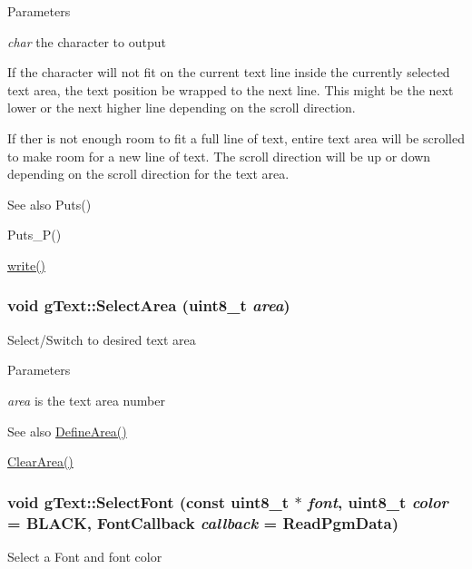 \begin{DoxyParams}{Parameters}
\item[{\em char}]the character to output\end{DoxyParams}
If the character will not fit on the current text line inside the currently selected text area, the text position be wrapped to the next line. This might be the next lower or the next higher line depending on the scroll direction.

If ther is not enough room to fit a full line of text, entire text area will be scrolled to make room for a new line of text. The scroll direction will be up or down depending on the scroll direction for the text area.

\begin{DoxySeeAlso}{See also}
Puts() 

Puts\_\-P() 

\hyperlink{classg_text_a7f537bfce982c46779f61321df66b018}{write()} 
\end{DoxySeeAlso}
\hypertarget{classg_text_a3d2fcd1f48b1e44611b7cf6fb2bae5db}{
\subsubsection[{SelectArea}]{\setlength{\rightskip}{0pt plus 5cm}void gText::SelectArea (uint8\_\-t {\em area})}}
\label{classg_text_a3d2fcd1f48b1e44611b7cf6fb2bae5db}
Select/Switch to desired text area


\begin{DoxyParams}{Parameters}
\item[{\em area}]is the text area number \end{DoxyParams}
\begin{DoxySeeAlso}{See also}
\hyperlink{classg_text_a8bc94b15c7864ef34491e8ef5681bfd4}{DefineArea()} 

\hyperlink{classg_text_a8918c2e7b5b1121a6c9051db049c85bf}{ClearArea()} 
\end{DoxySeeAlso}
\hypertarget{classg_text_a400107517f9f5fa106b692d1c15165d0}{
\subsubsection[{SelectFont}]{\setlength{\rightskip}{0pt plus 5cm}void gText::SelectFont (const uint8\_\-t $\ast$ {\em font}, \/  uint8\_\-t {\em color} = {\ttfamily BLACK}, \/  FontCallback {\em callback} = {\ttfamily ReadPgmData})}}
\label{classg_text_a400107517f9f5fa106b692d1c15165d0}
Select a Font and font color


